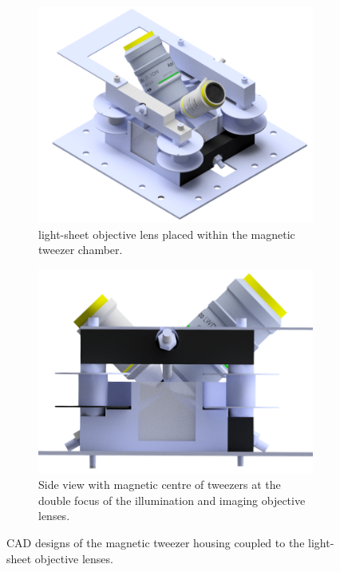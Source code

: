 \begin{figure}
 \centering
 \begin{subfigure}[t]{0.45\linewidth}
  \centering
  \includegraphics[width=\linewidth]{tweezer_spim_render_shooped}
  \caption{\Gls{light-sheet} objective lens placed within the magnetic tweezer chamber.}
 \end{subfigure}\quad
 \begin{subfigure}[t]{0.45\linewidth}
  \centering
  \includegraphics[width=\linewidth]{tweezer_spim_render_side}
  \caption{Side view with magnetic centre of tweezers at the double focus of the illumination and imaging objective lenses.}
 \end{subfigure}
 \caption{CAD designs of the magnetic tweezer housing coupled to the light-sheet objective lenses.}\label{fig:tweezer_spim}
\end{figure}
